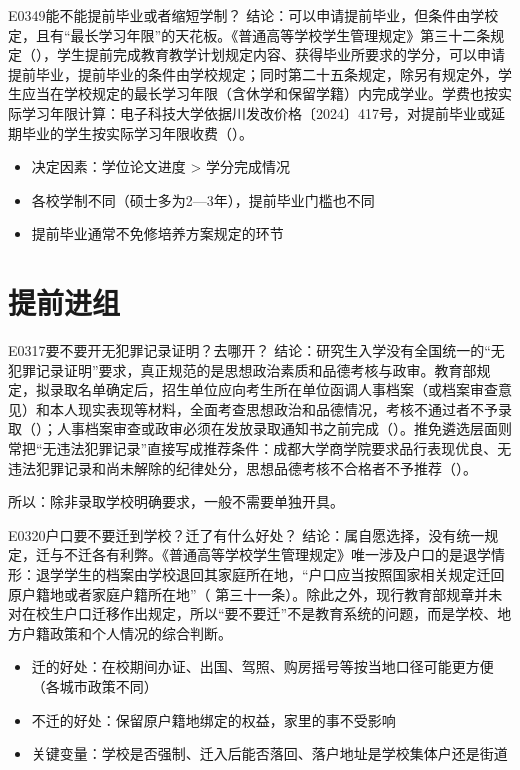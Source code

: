 \begin{qa}{E0349}{能不能提前毕业或者缩短学制？}
结论：可以申请提前毕业，但条件由学校定，且有“最长学习年限”的天花板。《普通高等学校学生管理规定》第三十二条规定（），学生提前完成教育教学计划规定内容、获得毕业所要求的学分，可以申请提前毕业，提前毕业的条件由学校规定；同时第二十五条规定，除另有规定外，学生应当在学校规定的最长学习年限（含休学和保留学籍）内完成学业。学费也按实际学习年限计算：电子科技大学依据川发改价格〔2024〕417号，对提前毕业或延期毕业的学生按实际学习年限收费（）。

\begin{itemize}
  \item 决定因素：学位论文进度 \textgreater{} 学分完成情况
  \item 各校学制不同（硕士多为2—3年），提前毕业门槛也不同
  \item 提前毕业通常不免修培养方案规定的环节
\end{itemize}
\end{qa}

\section{提前进组}
\begin{qa}{E0317}{要不要开无犯罪记录证明？去哪开？}
结论：研究生入学没有全国统一的“无犯罪记录证明”要求，真正规范的是思想政治素质和品德考核与政审。教育部规定，拟录取名单确定后，招生单位应向考生所在单位函调人事档案（或档案审查意见）和本人现实表现等材料，全面考查思想政治和品德情况，考核不通过者不予录取（）；人事档案审查或政审必须在发放录取通知书之前完成（）。推免遴选层面则常把“无违法犯罪记录”直接写成推荐条件：成都大学商学院要求品行表现优良、无违法犯罪记录和尚未解除的纪律处分，思想品德考核不合格者不予推荐（）。

所以：除非录取学校明确要求，一般不需要单独开具。
\end{qa}

\begin{qa}{E0320}{户口要不要迁到学校？迁了有什么好处？}
结论：属自愿选择，没有统一规定，迁与不迁各有利弊。《普通高等学校学生管理规定》唯一涉及户口的是退学情形：退学学生的档案由学校退回其家庭所在地，“户口应当按照国家相关规定迁回原户籍地或者家庭户籍所在地”（ 第三十一条）。除此之外，现行教育部规章并未对在校生户口迁移作出规定，所以“要不要迁”不是教育系统的问题，而是学校、地方户籍政策和个人情况的综合判断。

\begin{itemize}
  \item 迁的好处：在校期间办证、出国、驾照、购房摇号等按当地口径可能更方便（各城市政策不同）
  \item 不迁的好处：保留原户籍地绑定的权益，家里的事不受影响
  \item 关键变量：学校是否强制、迁入后能否落回、落户地址是学校集体户还是街道
\end{itemize}
\end{qa}

